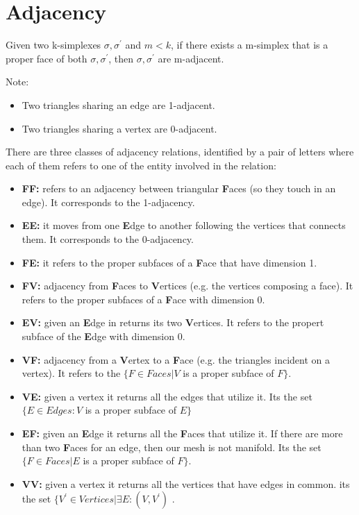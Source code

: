 \section{Adjacency}
Given two k-simplexes $\sigma, \sigma^{'}$ and $m<k$, if there exists a m-simplex that is a proper face of both $\sigma, \sigma^{'}$, then $\sigma, \sigma^{'}$ are m-adjacent.\par
Note:
\begin{itemize}
    \item Two triangles sharing an edge are 1-adjacent.
    \item Two triangles sharing a vertex are 0-adjacent.
\end{itemize}

There are three classes of adjacency relations, identified by a pair of letters where each of them refers to one of the entity involved in the relation:

\begin{itemize}
    \item \textbf{FF:} refers to an adjacency between triangular \textbf{F}aces (so they touch in an edge). It corresponds to the 1-adjacency.
    
    \item \textbf{EE:} it moves from one \textbf{E}dge to another following the vertices that connects them. It corresponds to the 0-adjacency.

    \item \textbf{FE:} it refers to the proper subfaces of a \textbf{F}ace that have dimension 1.
    
    \item \textbf{FV:} adjacency from \textbf{F}aces to \textbf{V}ertices (e.g. the vertices composing a face). It refers to the proper subfaces of a \textbf{F}ace with dimension 0.

    \item \textbf{EV:} given an \textbf{E}dge in returns its two \textbf{V}ertices. It refers to the propert subface of the \textbf{E}dge with dimension 0.
    
    \item \textbf{VF:} adjacency from a \textbf{V}ertex to a \textbf{F}ace (e.g. the triangles incident on a vertex). It refers to the $\{F \in Faces | V $ is a proper subface of $F\}$.

    \item \textbf{VE:} given a vertex it returns all the edges that utilize it. Its the set $\{ E \in Edges : V $ is a proper subface of $E \}$

    \item \textbf{EF:} given an \textbf{E}dge it returns all the \textbf{F}aces that utilize it. If there are more than two \textbf{F}aces for an edge, then our mesh is not manifold. Its the set $\{F \in Faces | E$ is a proper subface of $F \}$.

    \item \textbf{VV:} given a vertex it returns all the vertices that have edges in common. its the set $\{ V^{'} \in Vertices | \exists E:(V,V^{'})$ .
\end{itemize}

